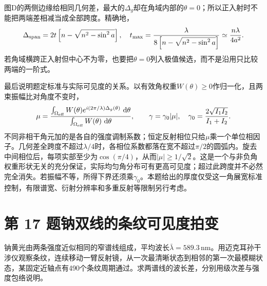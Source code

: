 \documentclass[UTF8,fontset=fandol,a4paper,11pt]{ctexart}
\newcommand{\dd}{\mathop{}\!\mathrm{d}}
\begin{document}
图D的两侧边缘给相同几何差，最大的$\Delta_g$却在角域内部的$\theta=0$；所以正入射时不能把两端差相减当成全部跨度。精确地，
\[
\Delta_{\rm span}=2t\left[n-\sqrt{n^2-\sin^2a}\right],
\quad
t_{\max}=\frac{\lambda}{8\left[n-\sqrt{n^2-\sin^2a}\right]}
\simeq\frac{n\lambda}{4a^2}.
\]
若角域横跨正入射但中心不为零，也要把$\theta=0$列入极值候选，而不是沿用只比较两端的一阶式。

最后说明题定标准与实际可见度的关系。以有效角权重$W(\theta)\ge0$作归一化，且两束振幅比对角度不变时，
\[
\mu=\frac{\int_{\Omega_{\rm eff}}W(\theta)
 e^{i(2\pi/\lambda)\Delta_g(\theta)}\,\dd\theta}
{\int_{\Omega_{\rm eff}}W(\theta)\,\dd\theta},
\qquad \gamma=\gamma_0|\mu|,\quad
\gamma_0=\frac{2\sqrt{I_1I_2}}{I_1+I_2}.
\]
不同非相干角元加的是各自的强度调制系数；恒定反射相位只给$\mu$乘一个单位相因子。几何差全跨度不超过$\lambda/4$时，各相位系数都落在宽不超过$\pi/2$的圆弧内。旋去中间相位后，每项实部至少为$\cos(\pi/4)$，从而$|\mu|\ge1/\sqrt2$。这是一个与非负角权重形状无关的充分保证，实际均匀角分布可有更高可见度；超过此跨度并不必然完全消失。若振幅不等，所得下界还须乘$\gamma_0$。本题给出的厚度仅受这一角展宽标准控制，有限谱宽、衍射分辨率和多重反射等限制另行考虑。





\section*{第 17 题\quad 钠双线的条纹可见度拍变}\label{q:17}

钠黄光由两条强度近似相同的窄谱线组成，平均波长$\bar\lambda=589.3\,\mathrm{nm}$。用迈克耳孙干涉仪观察条纹，连续移动一臂反射镜，从一次最清晰状态到相邻的第一次最模糊状态，某固定近轴点有490个条纹周期通过。求两谱线的波长差，分别用级次差与强度包络说明。
\end{document}
